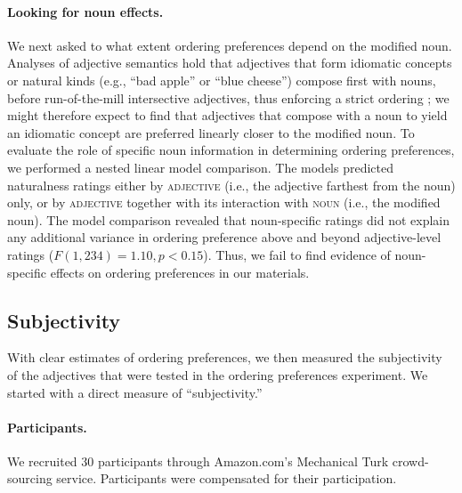 \documentclass[12pt]{article}
\begin{document}
\paragraph{Looking for noun effects.} We next asked to what extent ordering preferences depend on the modified noun. Analyses of adjective semantics hold that adjectives that form idiomatic concepts or natural kinds (e.g., ``bad apple'' or ``blue cheese'') compose first with nouns, before run-of-the-mill intersective adjectives, thus enforcing a strict ordering \citep{McNally2004,svenonius2008}; we might therefore expect to find that adjectives that compose with a noun to yield an idiomatic concept are preferred linearly closer to the modified noun. 
To evaluate the role of specific noun information in determining ordering preferences, we performed a nested linear model comparison. The models predicted naturalness ratings either by \textsc{adjective} (i.e., the adjective farthest from the noun) only, or by \textsc{adjective} together with its interaction with \textsc{noun} (i.e., the modified noun).
The model comparison revealed that noun-specific ratings did not explain any additional variance in ordering preference above and beyond adjective-level ratings ($F(1,234) = 1.10, p < 0.15$).  Thus, we fail to find evidence of noun-specific effects on ordering preferences in our materials. %


\subsection{Subjectivity}

With clear estimates of ordering preferences, we then measured the subjectivity of the adjectives that were tested in the ordering preferences experiment. We started with a direct measure of ``subjectivity.''

\paragraph{Participants.} We recruited 30 participants through Amazon.com's Mechanical Turk crowd-sourcing service. Participants were compensated 
for their participation. 
\end{document}
